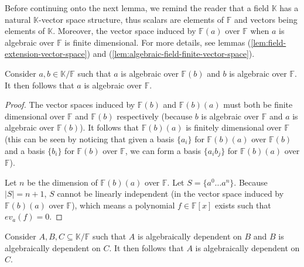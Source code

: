 Before continuing onto the next lemma, we remind the reader that a field $\mathbb{K}$ has a natural $\mathbb{K}$-vector space structure, thus scalars are elements of $\mathbb{F} $ and vectors being elements of $\mathbb K$. Moreover, the vector space induced by $\mathbb{F} (a)$ over $\mathbb{F} $ when $a$ is algebraic over $\mathbb{F} $ is finite dimensional. For more details, see lemmas (\ref{lem:field-extension-vector-space}) and (\ref{lem:algebraic-field-finite-vector-space}).

\begin{lemma}\label{lem:algebraic-transitivity}
	Consider $a, b \in \mathbb K / \mathbb{F} $ such that $a$ is algebraic over $\mathbb{F}(b) $ and $b$ is algebraic over $\mathbb{F}$. It then follows that $a$ is algebraic over $\mathbb{F}$.
\end{lemma}

\begin{proof}
	The vector spaces induced by $\mathbb{F} (b)$ and $\mathbb{F} (b)(a)$ must both be finite dimensional over $\mathbb{F} $ and $\mathbb{F} (b)$ respectively (because $b$ is algebraic over $\mathbb{F} $ and $a$ is algebraic over $\mathbb{F} (b)$). It follows that $\mathbb{F} (b)(a)$ is finitely dimensional over $\mathbb{F}$ (this can be seen by noticing that given a basis $\{a _i \}$ for $\mathbb{F} (b)(a)$ over $\mathbb{F} (b)$ and a basis $\{b _i\}$ for $\mathbb{F} (b)$ over $\mathbb{F} $, we can form a basis $\{a _i b _j\}$ for $\mathbb{F} (b)(a)$ over $\mathbb{F} $).

	Let $n$ be the dimension of $\mathbb{F} (b)(a)$ over $\mathbb{F} $. Let $S = \{a ^0 \ldots a ^n \}$. Because $|S| = n + 1$, $S$ cannot be linearly independent (in the vector space induced by $\mathbb{F} (b)(a)$ over $\mathbb{F} $), which means a polynomial $f \in \mathbb{F} [x]$ exists such that $ev_a(f) = 0$.
\end{proof}

\begin{lemma}\label{lem:algebraic-dependence-transitivity}
	Consider $A, B, C \subseteq \mathbb K / \mathbb{F} $ such that $A$ is algebraically dependent on $B$ and $B$ is algebraically dependent on $C$. It then follows that $A$ is algebraically dependent on $C$.
\end{lemma}

